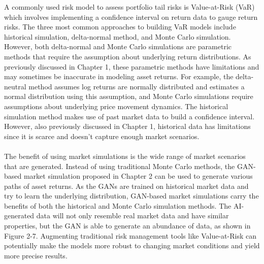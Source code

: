 A commonly used risk model to assess portfolio tail risks is Value-at-Risk (VaR) which involves implementing a confidence interval on return data to gauge return risks. The three most common approaches to building VaR models include historical simulation, delta-normal method, and Monte Carlo simulation. However, both delta-normal and Monte Carlo simulations are parametric methods that require the assumption about underlying return distributions. As previously discussed in Chapter 1, these parametric methods have limitations and may sometimes be inaccurate in modeling asset returns. For example, the delta-neutral method assumes log returns are normally distributed and estimates a normal distribution using this assumption, and Monte Carlo simulations require assumptions about underlying price movement dynamics. The historical simulation method makes use of past market data to build a confidence interval. However, also previously discussed in Chapter 1, historical data has limitations since it is scarce and doesn't capture enough market scenarios. 
\\ \\
The benefit of using market simulations is the wide range of market scenarios that are generated. Instead of using traditional Monte Carlo methods, the GAN-based market simulation proposed in Chapter 2 can be used to generate various paths of asset returns. As the GANs are trained on historical market data and try to learn the underlying distribution, GAN-based market simulations carry the benefits of both the historical and Monte Carlo simulation methods. The AI-generated data will not only resemble real market data and have similar properties, but the GAN is able to generate an abundance of data, as shown in Figure 2-7. Augmenting traditional risk management tools like Value-at-Risk can potentially make the models more robust to changing market conditions and yield more precise results.
